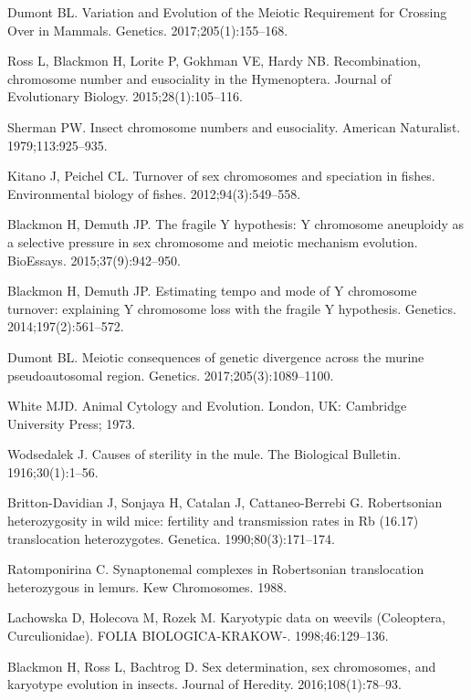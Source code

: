 \documentclass[]{rsos}%
\begin{document}
\begin{thebibliography}{99}
Dumont BL.
 Variation and Evolution of the Meiotic Requirement for Crossing Over
  in Mammals.
 Genetics. 2017;205(1):155--168.

Ross L, Blackmon H, Lorite P, Gokhman VE, Hardy NB.
 Recombination, chromosome number and eusociality in the
  {H}ymenoptera.
 Journal of Evolutionary Biology. 2015;28(1):105--116.

Sherman PW.
 Insect chromosome numbers and eusociality.
 American Naturalist. 1979;113:925--935.

Kitano J, Peichel CL.
 Turnover of sex chromosomes and speciation in fishes.
 Environmental biology of fishes. 2012;94(3):549--558.

Blackmon H, Demuth JP.
 The fragile Y hypothesis: Y chromosome aneuploidy as a selective
  pressure in sex chromosome and meiotic mechanism evolution.
 BioEssays. 2015;37(9):942--950.

Blackmon H, Demuth JP.
 Estimating tempo and mode of Y chromosome turnover: explaining Y
  chromosome loss with the fragile Y hypothesis.
 Genetics. 2014;197(2):561--572.

Dumont BL.
 Meiotic consequences of genetic divergence across the murine
  pseudoautosomal region.
 Genetics. 2017;205(3):1089--1100.

White MJD.
 Animal Cytology and Evolution.
 London, UK: Cambridge University Press; 1973.

Wodsedalek J.
 Causes of sterility in the mule.
 The Biological Bulletin. 1916;30(1):1--56.

Britton-Davidian J, Sonjaya H, Catalan J, Cattaneo-Berrebi G.
 Robertsonian heterozygosity in wild mice: fertility and transmission
  rates in Rb (16.17) translocation heterozygotes.
 Genetica. 1990;80(3):171--174.

Ratomponirina C.
 Synaptonemal complexes in Robertsonian translocation heterozygous in
  lemurs.
 Kew Chromosomes. 1988.

Lachowska D, Holecova M, Rozek M.
 Karyotypic data on weevils (Coleoptera, Curculionidae).
 FOLIA BIOLOGICA-KRAKOW-. 1998;46:129--136.

Blackmon H, Ross L, Bachtrog D.
 Sex determination, sex chromosomes, and karyotype evolution in
  insects.
 Journal of Heredity. 2016;108(1):78--93.


\end{thebibliography}
\end{document}
